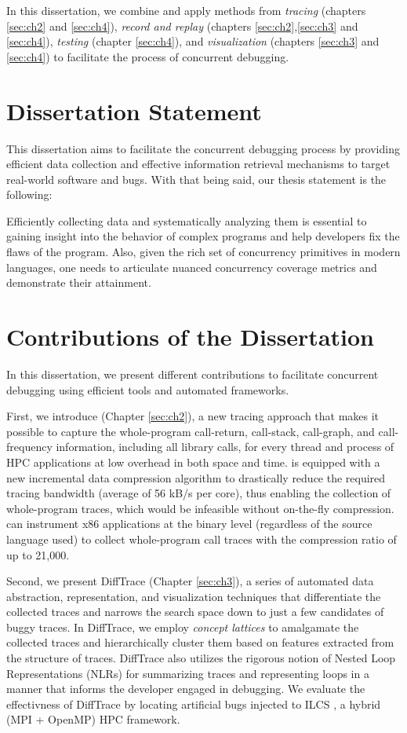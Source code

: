 In this dissertation, we combine and apply methods from \textit{tracing} (chapters \ref{sec:ch2} and \ref{sec:ch4}), \textit{record and replay} (chapters \ref{sec:ch2},\ref{sec:ch3} and \ref{sec:ch4}), \textit{testing} (chapter \ref{sec:ch4}), and \textit{visualization} (chapters \ref{sec:ch3} and \ref{sec:ch4}) to facilitate the process of concurrent debugging.



\section{Dissertation Statement}

This dissertation aims to facilitate the concurrent debugging process by providing efficient data collection and effective information retrieval mechanisms to target real-world software and bugs.
%
With that being said, our thesis statement is the following:

Efficiently collecting data and systematically analyzing them is essential to gaining insight into the behavior of complex programs and help developers fix the flaws of the program. Also, given the rich set of concurrency primitives in modern languages, one needs to articulate nuanced concurrency coverage metrics and demonstrate their attainment.

\section{Contributions of the Dissertation}
In this dissertation, we present different contributions to facilitate concurrent debugging using efficient tools and automated frameworks.
%

First, we introduce \parlot (Chapter \ref{sec:ch2}), a new tracing approach that makes it possible to capture the whole-program call-return, call-stack, call-graph, and call-frequency information, including all library calls, for every thread and process of HPC applications at low overhead in both space and time.
%
\parlot is equipped with a new incremental data compression algorithm to drastically reduce the required tracing bandwidth (average of 56 kB/s per core), thus enabling the collection of whole-program traces, which would be infeasible without on-the-fly compression.
%
\parlot can instrument x86 applications at the binary level (regardless of the source language used) to collect whole-program call traces with the compression ratio of up to 21,000.

Second, we present DiffTrace (Chapter \ref{sec:ch3}), a series of automated data abstraction, representation, and visualization techniques that differentiate the collected \parlot traces and narrows the search space down to just a few candidates of buggy traces.
%
In DiffTrace, we employ {\em concept lattices} to amalgamate the collected traces and hierarchically cluster them based on features extracted from the structure of traces.
%
DiffTrace also utilizes the rigorous notion of Nested Loop Representations (NLRs) for summarizing traces and representing loops in a manner that informs the developer engaged in debugging.
%
We evaluate the effectivness of DiffTrace by locating artificial bugs injected to ILCS \cite{ilcs}, a hybrid (MPI + OpenMP) HPC framework.

